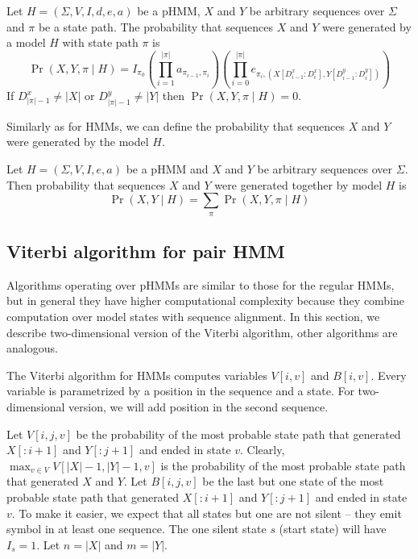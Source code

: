 \begin{definition}
Let $H=(\Sigma,V,I,d,e,a)$ be  a pHMM, $X$ and $Y$ be arbitrary sequences over
$\Sigma$ and $\pi$ be a state path. The probability that sequences $X$ and $Y$
were generated by a model $H$  with state path $\pi$ is
\begin{equation}
\Pr\left(X,Y,\pi\mid H\right)=
I_{\pi_0}
\left(
	\prod_{i=1}^{|\pi|}a_{\pi_{i-1},\pi_i}
\right)
\left(
	\prod_{i=0}^{|\pi|}e_{\pi_i,(X[D^x_{i-1}:D^x_{i}],Y[D^y_{i-1}:D^y_{i}])}
\right)
\end{equation}
If $D^x_{|\pi|-1}\not=|X|$ or $D^y_{|\pi|-1}\not=|Y|$ then
$\Pr\left(X,Y,\pi\mid H\right)=0$. 
\end{definition}

Similarly as for HMMs, we can define the probability that sequences $X$ and $Y$ were
generated by the model $H$.

\begin{definition}
Let $H=(\Sigma,V,I,e,a)$ be a pHMM and  $X$ and $Y$ be arbitrary sequences over
$\Sigma$. Then probability that sequences $X$ and $Y$ were generated together by
model $H$ is 
\begin{equation}
\Pr\left(X,Y\mid H\right)=\sum_{\pi}\Pr\left(X,Y,\pi\mid H\right)
\end{equation}
\end{definition}


\subsection{Viterbi algorithm for pair HMM}
\label{SECTION:PAIRHMMVITERBI}
Algorithms operating over pHMMs are similar to those for the regular HMMs, but
in general they have higher computational complexity because they combine
computation  over model states with sequence alignment.  In this section, we
describe two-dimensional version of the Viterbi algorithm, other algorithms are
analogous.

The Viterbi algorithm for HMMs computes variables $V[i,v]$ and $B[i,v]$. Every
variable is parametrized by a position in the sequence and a state. For
two-dimensional version, we will add position in the second sequence.

Let $V[i,j,v]$ be the probability of the most probable state path that generated
$X[:i+1]$ and $Y[:j+1]$ and ended in state $v$. Clearly, $\max_{v\in
V}V[|X|-1,|Y|-1,v]$ is the probability of the most probable state path that
generated $X$ and $Y$. Let $B[i,j,v]$ be the last but one state of the most
probable state path that generated $X[:i+1]$ and $Y[:j+1]$ and ended in state
$v$. To make it easier, we expect that all states but one are not silent -- they emit
symbol in at least one sequence. The one silent state $s$ (start state) will have $I_s=1$.
 Let $n=|X|$ and $m=|Y|$.


